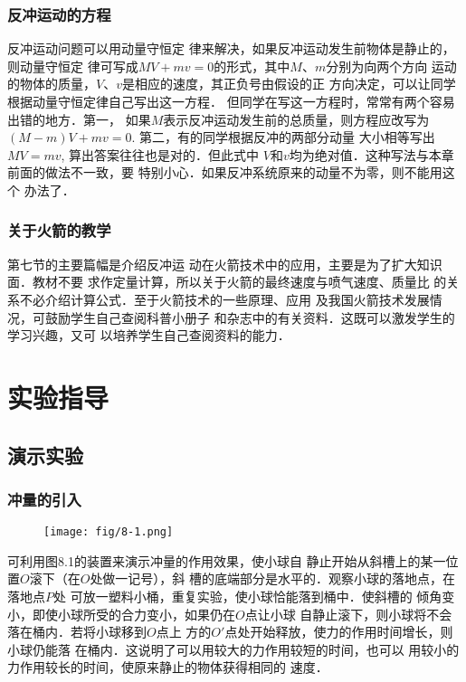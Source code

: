 \subsubsection{反冲运动的方程}

反冲运动问题可以用动量守恒定
律来解决，如果反冲运动发生前物体是静止的，则动量守恒定
律可写成$MV+mv=0$的形式，其中$M$、$m$分别为向两个方向
运动的物体的质量，$V$、$v$是相应的速度，其正负号由假设的正
方向决定，可以让同学根据动量守恒定律自己写出这一方程．
但同学在写这一方程时，常常有两个容易出错的地方．第一，
如果$M$表示反冲运动发生前的总质量，则方程应改写为
$(M-m)V+mv=0$. 第二，有的同学根据反冲的两部分动量
大小相等写出$MV=mv$, 算出答案往往也是对的．但此式中
$V$和$v$均为绝对值．这种写法与本章前面的做法不一致，要
特别小心．如果反冲系统原来的动量不为零，则不能用这个
办法了．

\subsubsection{关于火箭的教学}

第七节的主要篇幅是介绍反冲运
动在火箭技术中的应用，主要是为了扩大知识面．教材不要
求作定量计算，所以关于火箭的最终速度与喷气速度、质量比
的关系不必介绍计算公式．至于火箭技术的一些原理、应用
及我国火箭技术发展情况，可鼓励学生自己查阅科普小册子
和杂志中的有关资料．这既可以激发学生的学习兴趣，又可
以培养学生自己查阅资料的能力．

\section{实验指导}
\subsection{演示实验}
\subsubsection{冲量的引入}

\begin{figure}[htp]
    \centering
    \texttt{[image: fig/8-1.png]}
    \caption{}
\end{figure}

可利用图8.1的装置来演示冲量的作用效果，使小球自
静止开始从斜槽上的某一位置$O$滚下（在$O$处做一记号），斜
槽的底端部分是水平的．观察小球的落地点，在落地点$P$处
可放一塑料小桶，重复实验，使小球恰能落到桶中．使斜槽的
倾角变小，即使小球所受的合力变小，如果仍在$O$点让小球
自静止滚下，则小球将不会落在桶内．若将小球移到$O$点上
方的$O'$点处开始释放，使力的作用时间增长，则小球仍能落
在桶内．这说明了可以用较大的力作用较短的时间，也可以
用较小的力作用较长的时间，使原来静止的物体获得相同的
速度．

